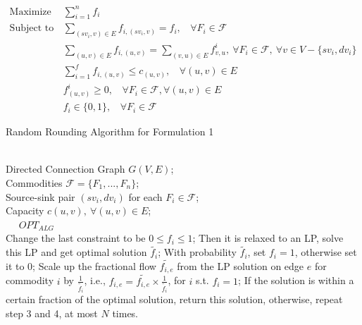 \documentclass[conference]{IEEEtran}
\begin{document}
\begin{equation} \nonumber
\begin{aligned}
\text{Maximize } &\sum_{i=1}^{n}f_i \\  \nonumber
\text{Subject to } &\sum_{(sv_i,v) \in E}f_{i, (sv_i,v)} = f_i,~~~~ \forall F_i \in \mathcal{F} \\ \nonumber
&\sum_{(u, v) \in E}f_{i,(u, v)} = \sum_{(v, u) \in E}f_{v, u}^i, ~\forall F_i \in \mathcal{F}, ~ \forall v \in V - \{sv_i,dv_i\} \\  \nonumber
&\sum_{i=1}^{f}f_{i,(u, v)} \leq c_{(u, v)},~~~~ \forall (u, v) \in E \\ \nonumber
&f_{(u, v)}^i \geq 0,~~~~ \forall F_i \in \mathcal{F},  \forall (u, v) \in E \\ \nonumber
&f_i \in \{0, 1\},~~~~ \forall F_i \in \mathcal{F} \nonumber
\end{aligned}
\end{equation}


\begin{algorithm}[t]
	\small
	\renewcommand{\algorithmicrequire}{\textbf{Input:}}
	\renewcommand\algorithmicensure {\textbf{Output:} }
	\caption{Random Rounding Algorithm for Formulation 1}
	\label{alg:randomrounding}
	\begin{algorithmic}[1] %
		\REQUIRE ~~\\ %
		Directed Connection Graph $G(V, E)$;\\
		Commodities $\mathcal{F} = \{F_1, ..., F_n\}$;\\
		Source-sink pair $(sv_i, dv_i)$ for each $ F_i \in \mathcal{F}$;\\
		Capacity $c(u, v), ~ \forall (u, v)\in E$;\\
		\ENSURE ~~ $OPT_{ALG}$\\ 
		\STATE Change the last constraint to be 
		$0 \leq f_i \leq 1$;
		\STATE Then it is relaxed to an LP, solve this LP and get optimal solution $\tilde{f_i}$;
		\STATE With probability $\tilde{f_i}$, set $f_i = 1$, otherwise set it to $0$;
		\STATE Scale up the fractional flow $\tilde{f_{i,e}}$ from the LP solution on edge $e$ for commodity $i$ by $\frac{1}{\tilde{f_i}}$, i.e., $f_{i,e} = \tilde{f_{i,e}} \times \frac{1}{\tilde{f_i}}$, for $i$ s.t. $f_i = 1$;
		\STATE If the solution is within a certain fraction of the optimal solution, return this solution, otherwise, repeat step 3 and 4, at most $N$ times.
		
	\end{algorithmic}
\end{algorithm}
\end{document}
